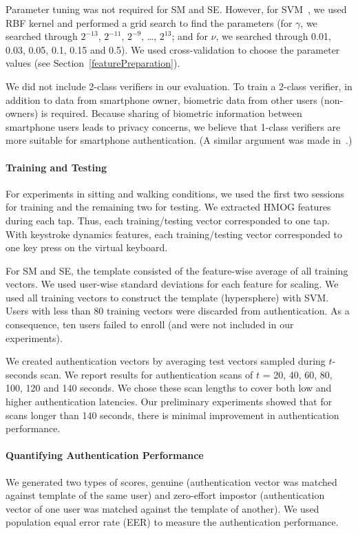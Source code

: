  
Parameter tuning was not required for SM and SE. However, for SVM~\cite{libSVM}, we used RBF kernel and performed a grid search to find the parameters (for $\gamma$, we searched through $2^{-13}$, $2^{-11}$,  $2^{-9}$, \dots, $2^{13}$; and for $\nu$, we searched through 0.01, 0.03, 0.05, 0.1, 0.15 and 0.5). We used cross-validation to choose the parameter values (see Section~\ref{featurePreparation}).
 
We did not include 2-class verifiers in our evaluation. To train a 2-class verifier, in addition to data from smartphone owner, biometric data from other users (non-owners) is required. Because sharing of biometric information between smartphone users leads to privacy concerns, we believe that 1-class verifiers are more suitable for smartphone authentication. (A similar argument was made in~\cite{shen2013user}.)


\paragraph{Training and Testing}  For experiments in sitting and walking conditions, we used the first two sessions for training and the remaining two for testing. We extracted HMOG features during each tap. Thus, each training/testing vector corresponded to one tap. With keystroke dynamics features, each training/testing vector corresponded to one key press on the virtual keyboard.%

For SM and SE, the template consisted of the feature-wise average of all training vectors. We used user-wise standard deviations for each feature for scaling. We used all training vectors to construct the template (hypersphere) with SVM.
%
%
Users with less than 80 training vectors were discarded from authentication. As a consequence, ten users failed to enroll (and were not included in our experiments). 


We created authentication vectors by averaging test vectors sampled during $t$-seconds scan. We report results for authentication scans of $t$ = 20, 40, 60, 80, 100, 120 and 140 seconds. We chose these scan lengths to cover both low and higher authentication latencies. Our preliminary experiments showed that for scans longer than 140 seconds, there is minimal improvement in authentication performance. 

\paragraph{Quantifying Authentication Performance}
We generated two types of scores, genuine (authentication vector was matched against template of the same user) and zero-effort impostor (authentication vector of one user was matched against the template of another). We used population equal error rate (EER) to measure the authentication performance.


